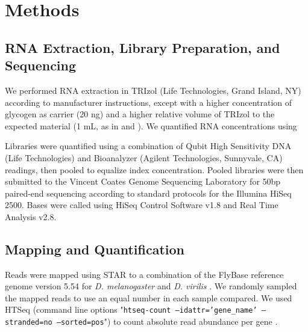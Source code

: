 \section{Methods}


\subsection{RNA Extraction, Library Preparation, and Sequencing}


We performed RNA extraction in TRIzol (Life Technologies, Grand Island, NY) according to manufacturer instructions, except with a higher concentration of glycogen as carrier (20 ng) and a higher relative volume of TRIzol to the expected material (1 mL, as in \cite{Lott:2011cc} and \cite{Combs:2013jy}). We quantified RNA concentrations using 


Libraries were quantified using a combination of Qubit High Sensitivity DNA (Life Technologies) and Bioanalyzer (Agilent Technologies, Sunnyvale, CA) readings, then pooled to equalize index concentration. Pooled libraries were then submitted to the Vincent Coates Genome Sequencing Laboratory for 50bp paired-end sequencing according to standard protocols for the Illumina HiSeq 2500. Bases were called using HiSeq Control Software v1.8 and Real Time Analysis v2.8.


\subsection{Mapping and Quantification}


Reads were mapped using STAR \cite{Dobin:2012fg} to a combination of the FlyBase reference genome version 5.54 for {\em D. melanogaster} and {\em D. virilis} \cite{McQuilton:2011iq}. We randomly sampled the mapped reads to use an equal number in each sample compared. We used HTSeq (command line options "{\tt htseq-count --idattr='gene_name' --stranded=no --sorted=pos}") to count absolute read abundance per gene \cite{Anders_2014}.
